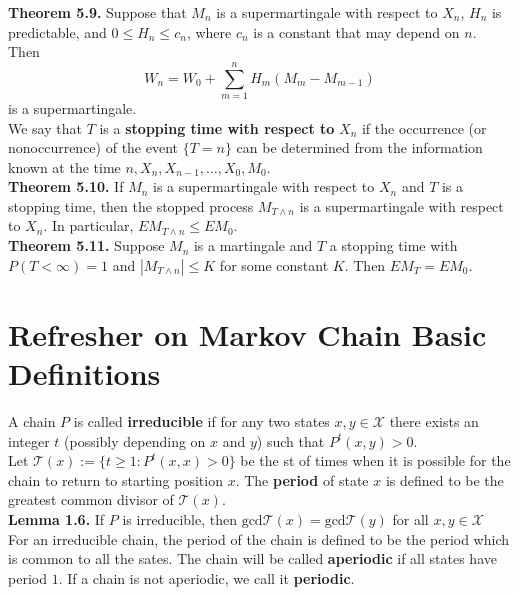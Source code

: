 \documentclass[12pt]{article}
\begin{document}
\textbf{Theorem 5.9.} Suppose that $M_n$ is a supermartingale with respect to $X_n$, $H_n$ is predictable, and $0 \leq H_n \leq c_n$, where $c_n$ is a constant that may depend on $n$. Then $$W_n = W_0 + \sum_{m=1}^n H_m (M_m - M_{m-1})$$ is a supermartingale.\\

We say that $T$ is a \textbf{stopping time with respect to} $X_n$ if the occurrence (or nonoccurrence) of the event $\{T = n\}$ can be determined from the information known at the time $n, X_n, X_{n-1}, \ldots, X_0, M_0$.\\

\textbf{Theorem 5.10.} If $M_n$ is a supermartingale with respect to $X_n$ and $T$ is a stopping time, then the stopped process $M_{T \wedge n}$ is a supermartingale with respect to $X_n$. In particular, $EM_{T \wedge n} \leq EM_0$.\\

\textbf{Theorem 5.11.} Suppose $M_n$ is a martingale and $T$ a stopping time with $P(T < \infty) = 1$ and $|M_{T \wedge n}| \leq K$ for some constant $K$. Then $EM_T = EM_0$.


\section{Refresher on Markov Chain Basic Definitions}

A chain $P$ is called \textbf{irreducible} if for any two states $x, y \in \mathcal{X}$ there exists an integer $t$ (possibly depending on $x$ and $y$) such that $P^t(x, y) > 0$.\\

Let $\mathcal{T}(x) := \{t \geq 1: P^t(x,x) > 0\}$ be the st of times when it is possible for the chain to return to starting position $x$. The \textbf{period} of state $x$ is defined to be the greatest common divisor of $\mathcal{T}(x)$.\\

\textbf{Lemma 1.6.} If $P$ is irreducible, then $\text{gcd}\mathcal{T}(x) = \text{gcd}\mathcal{T}(y)$ for all $x,y \in \mathcal{X}$\\

For an irreducible chain, the period of the chain is defined to be the period which is common to all the sates. The chain will be called \textbf{aperiodic} if all states have period $1$. If a chain is not aperiodic, we call it \textbf{periodic}.\\
\end{document}
